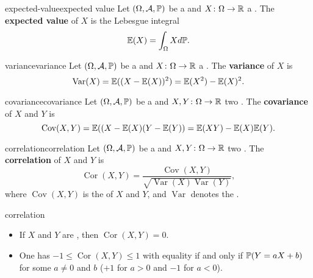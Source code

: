\begin{topic}{expected-value}{expected value}
    Let $(\Omega, \mathcal{A}, \mathbb{P})$ be a  and $X \colon \Omega \to \mathbb{R}$ a . The \textbf{expected value} of $X$ is the Lebesgue integral
    \[ \mathbb{E}(X) = \int_\Omega X d \mathbb{P} . \]
\end{topic}

\begin{topic}{variance}{variance}
    Let $(\Omega, \mathcal{A}, \mathbb{P})$ be a  and $X \colon \Omega \to \mathbb{R}$ a . The \textbf{variance} of $X$ is
    \[ \operatorname{Var}(X) = \mathbb{E}((X - \mathbb{E}(X))^2) = \mathbb{E}(X^2) - \mathbb{E}(X)^2 . \]
\end{topic}

\begin{topic}{covariance}{covariance}
    Let $(\Omega, \mathcal{A}, \mathbb{P})$ be a  and $X, Y \colon \Omega \to \mathbb{R}$ two . The \textbf{covariance} of $X$ and $Y$ is
    \[ \operatorname{Cov}(X, Y) = \mathbb{E}((X - \mathbb{E}(X) (Y - \mathbb{E}(Y)) = \mathbb{E}(XY) - \mathbb{E}(X) \mathbb{E}(Y) . \]
\end{topic}

\begin{topic}{correlation}{correlation}
    Let $(\Omega, \mathcal{A}, \mathbb{P})$ be a  and $X, Y \colon \Omega \to \mathbb{R}$ two . The \textbf{correlation} of $X$ and $Y$ is
    \[ \operatorname{Cor}(X, Y) = \frac{\operatorname{Cov}(X, Y)}{\sqrt{\operatorname{Var}(X) \operatorname{Var}(Y)}} , \]
    where $\operatorname{Cov}(X, Y)$ is the  of $X$ and $Y$, and $\operatorname{Var}$ denotes the .
\end{topic}

\begin{example}{correlation}
    \begin{itemize}
        \item If $X$ and $Y$ are , then $\operatorname{Cor}(X, Y) = 0$.
        \item One has $-1 \le \operatorname{Cor}(X, Y) \le 1$ with equality if and only if $\mathbb{P}(Y = a X + b)$ for some $a \ne 0$ and $b$ ($+1$ for $a > 0$ and $-1$ for $a < 0$).
    \end{itemize}
\end{example}

